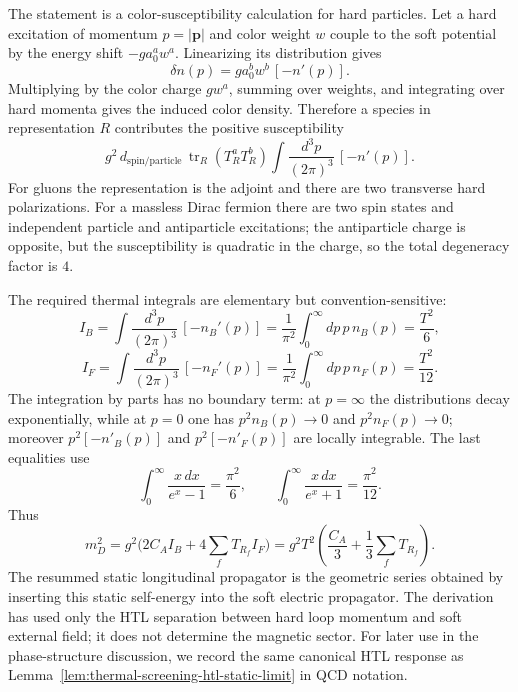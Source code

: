 The statement is a color-susceptibility calculation for hard particles.
Let a hard excitation of momentum \(p=|\mathbf p|\) and color weight \(w\)
couple to the soft potential by the energy shift
\(-g a_0^aw^a\).  Linearizing its distribution gives
\[
  \delta n(p)=g a_0^bw^b\,[-n'(p)] .
\]
Multiplying by the color charge \(gw^a\), summing over weights, and
integrating over hard momenta gives the induced color density.  Therefore a
species in representation \(R\) contributes the positive susceptibility
\[
  g^2\,d_{\mathrm{spin/particle}}\,
  \operatorname{tr}_R(T_R^aT_R^b)
  \int \frac{d^3p}{(2\pi)^3}\,[-n'(p)] .
\]
For gluons the representation is the adjoint and there are two transverse
hard polarizations.  For a massless Dirac fermion there are two spin states
and independent particle and antiparticle excitations; the antiparticle
charge is opposite, but the susceptibility is quadratic in the charge, so
the total degeneracy factor is \(4\).

The required thermal integrals are elementary but convention-sensitive:
\[
  I_B
  =
  \int \frac{d^3p}{(2\pi)^3}\,[-n_B'(p)]
  =
  \frac{1}{\pi^2}\int_0^\infty dp\,p\,n_B(p)
  =\frac{T^2}{6},
\]
\[
  I_F
  =
  \int \frac{d^3p}{(2\pi)^3}\,[-n_F'(p)]
  =
  \frac{1}{\pi^2}\int_0^\infty dp\,p\,n_F(p)
  =\frac{T^2}{12}.
\]
The integration by parts has no boundary term: at \(p=\infty\) the
distributions decay exponentially, while at \(p=0\) one has
\(p^2n_B(p)\to0\) and \(p^2n_F(p)\to0\); moreover
\(p^2[-n'_B(p)]\) and \(p^2[-n'_F(p)]\) are locally integrable.  The last
equalities use
\[
  \int_0^\infty \frac{x\,dx}{e^x-1}=\frac{\pi^2}{6},
  \qquad
  \int_0^\infty \frac{x\,dx}{e^x+1}=\frac{\pi^2}{12}.
\]
Thus
\[
  m_D^2
  =
  g^2\bigl(2C_A I_B+4\sum_fT_{R_f}I_F\bigr)
  =
  g^2T^2\left(\frac{C_A}{3}
  +\frac{1}{3}\sum_fT_{R_f}\right).
\]
The resummed static longitudinal propagator is the geometric series obtained
by inserting this static self-energy into the soft electric propagator.  The
derivation has used only the HTL separation between hard loop momentum and
soft external field; it does not determine the magnetic sector.
For later use in the phase-structure discussion, we record the same canonical
HTL response as Lemma~\ref{lem:thermal-screening-htl-static-limit} in QCD
notation.

